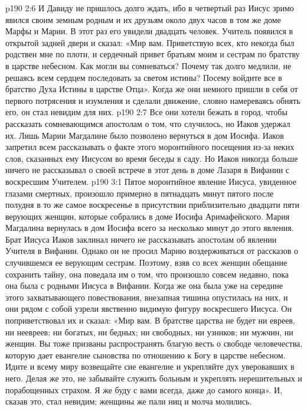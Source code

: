 \vs p190 2:6 \pc И Давиду не пришлось долго ждать, ибо в четвертый раз Иисус зримо явился своим земным родным и их друзьям около двух часов в том же доме Марфы и Марии. В этот раз его увидели двадцать человек. Учитель появился в открытой задней двери и сказал: «Мир вам. Приветствую всех, кто некогда был родствен мне по плоти, и сердечный привет братьям моим и сестрам по братству в царстве небесном. Как могли вы сомневаться? Почему так долго медлили, не решаясь всем сердцем последовать за светом истины? Посему войдите все в братство Духа Истины в царстве Отца». Когда же они немного пришли в себя от первого потрясения и изумления и сделали движение, словно намереваясь обнять его, он стал невидим для них.
\vs p190 2:7 \pc Все они хотели бежать в город, чтобы рассказать сомневающимся апостолам о том, что случилось, но Иаков удержал их. Лишь Марии Магдалине было позволено вернуться в дом Иосифа. Иаков запретил всем рассказывать о факте этого моронтийного посещения из\hyp{}за неких слов, сказанных ему Иисусом во время беседы в саду. Но Иаков никогда больше ничего не рассказывал о своей встрече в этот день в доме Лазаря в Вифании с воскресшим Учителем.
\vs p190 3:1 Пятое моронтийное явление Иисуса, увиденное глазами смертных, произошло примерно в пятнадцать минут пятого после полудня в то же самое воскресенье в присутствии приблизительно двадцати пяти верующих женщин, которые собрались в доме Иосифа Аримафейского. Мария Магдалина вернулась в дом Иосифа всего за несколько минут до этого явления. Брат Иисуса Иаков заклинал ничего не рассказывать апостолам об явлении Учителя в Вифании. Однако он не просил Марию воздерживаться от рассказов о случившемся ее верующим сестрам. Поэтому, взяв со всех женщин обещание сохранить тайну, она поведала им о том, что произошло совсем недавно, пока она была с родными Иисуса в Вифании. Когда же она была уже на середине этого захватывающего повествования, внезапная тишина опустилась на них, и они рядом с собой узрели явственно видимую фигуру воскресшего Иисуса. Он поприветствовал их и сказал: «Мир вам. В братстве царства не будет ни евреев, ни неевреев; ни богатых, ни бедных; ни свободных, ни узников; ни мужчин, ни женщин. Вы тоже призваны распространять благую весть о свободе человечества, которую дает евангелие сыновства по отношению к Богу в царстве небесном. Идите и всему миру возвещайте сие евангелие и укрепляйте дух уверовавших в него. Делая же это, не забывайте служить больным и укреплять нерешительных и порабощенных страхом. Я же буду с вами всегда, даже до самого конца». И, сказав это, стал невидим; женщины же пали ниц и молча молились.
